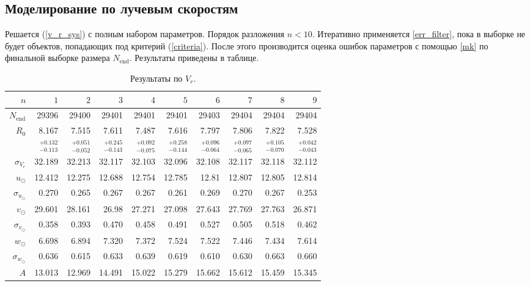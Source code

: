 \documentclass{matmex-diploma-custom}
\begin{document}
\subsection{Моделирование по лучевым скоростям} \label{vr_res}
Решается (\ref{v_r_sys}) с полным набором параметров. Порядок разложения $n < 10$. Итеративно применяется \ref{err_filter}, пока в выборке не будет объектов, попадающих под критерий (\ref{criteria}). После этого производится оценка ошибок параметров с помощью \ref{mk} по финальной выборке размера $N_{\mathrm{end}}$. Результаты приведены в таблице. 
\begin{table}[h!!]
\centering
\caption{Результаты по $V_r$.}
\begin{tabular}{r|rr|r|rrrrrr}
\hline
 $n$ & $1$ & $2$ & $3$ & $4$ & $5$&$ 6 $&$ 7 $&$ 8 $&$ 9 $\\\hline
 $N_{\mathrm{end}}$ & 29396       &   29400 &   29401 &   29401 &   29401 &   29403 &   29404 &   29404 &   29404  \\
 $R_0 $& 8.167       &   7.515 &   7.611 &   7.487 &   7.616 &   7.797 &   7.806 &   7.822 &   7.528  \\
       & $_{-0.113}^{+0.132} $ & $_{-0.052}^{+0.051}$  & $_{-0.143}^{+0.245}$   & $_{-0.075}^{+0.092}$  & $_{-0.144}^{+0.258}$  & $_{-0.064}^{+0.096}$  & $_{-0.065}^{+0.097}$  & $_{-0.070}^{+0.105}$  & $_{-0.043}^{+0.042}$  \\\hline
 $\sigma_{V_r} $& 32.189      &  32.213 &  32.117 &  32.103 &  32.096 &  32.108 &  32.117 &  32.118 &  32.112  \\
 $ u_{\odot} $& 12.412      &  12.275 &  12.688 &  12.754 &  12.785 &   12.81 &  12.807 &  12.805 &  12.814  \\
 $\sigma_{u_{\odot}} $&0.270       &   0.265 &   0.267 &   0.267 &   0.261 &   0.269 &    0.270 &   0.267 &   0.253  \\
 $v_{\odot} $& 29.601      &  28.161 &   26.98 &  27.271 &  27.098 &  27.643 &  27.769 &  27.763 &  26.871  \\
 $\sigma_{v_{\odot}}$&0.358       &   0.393 &    0.470 &   0.458 &   0.491 &   0.527 &   0.505 &   0.518 &   0.462  \\
 $w_{\odot} $&6.698       &   6.894 &    7.320 &   7.372 &   7.524 &   7.522 &   7.446 &   7.434 &   7.614  \\
 $\sigma_{w_{\odot}} $& 0.636       &   0.615 &   0.633 &   0.639 &   0.619 &    0.610 &    0.630 &   0.663 &    0.660  \\\hline
 $A $&13.013      &  12.969 &  14.491 &  15.022 &  15.279 &  15.662 &  15.612 &  15.459 &  15.345  \\

\end{tabular}
\end{table}
\end{document}

